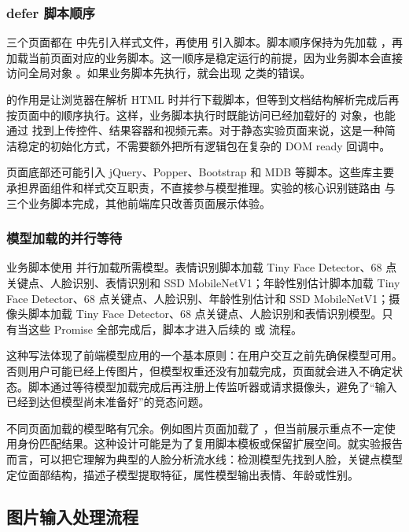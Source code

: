 \subsubsection{defer 脚本顺序}

三个页面都在  中先引入样式文件，再使用  引入脚本。脚本顺序保持为先加载 ，再加载当前页面对应的业务脚本。这一顺序是稳定运行的前提，因为业务脚本会直接访问全局对象 。如果业务脚本先执行，就会出现  之类的错误。

 的作用是让浏览器在解析 HTML 时并行下载脚本，但等到文档结构解析完成后再按页面中的顺序执行。这样，业务脚本执行时既能访问已经加载好的  对象，也能通过  找到上传控件、结果容器和视频元素。对于静态实验页面来说，这是一种简洁稳定的初始化方式，不需要额外把所有逻辑包在复杂的 DOM ready 回调中。

页面底部还可能引入 jQuery、Popper、Bootstrap 和 MDB 等脚本。这些库主要承担界面组件和样式交互职责，不直接参与模型推理。实验的核心识别链路由  与三个业务脚本完成，其他前端库只改善页面展示体验。

\subsubsection{模型加载的并行等待}

业务脚本使用  并行加载所需模型。表情识别脚本加载 Tiny Face Detector、68 点关键点、人脸识别、表情识别和 SSD MobileNetV1；年龄性别估计脚本加载 Tiny Face Detector、68 点关键点、人脸识别、年龄性别估计和 SSD MobileNetV1；摄像头脚本加载 Tiny Face Detector、68 点关键点、人脸识别和表情识别模型。只有当这些 Promise 全部完成后，脚本才进入后续的  或  流程。

这种写法体现了前端模型应用的一个基本原则：在用户交互之前先确保模型可用。否则用户可能已经上传图片，但模型权重还没有加载完成，页面就会进入不确定状态。脚本通过等待模型加载完成后再注册上传监听器或请求摄像头，避免了“输入已经到达但模型尚未准备好”的竞态问题。

不同页面加载的模型略有冗余。例如图片页面加载了 ，但当前展示重点不一定使用身份匹配结果。这种设计可能是为了复用脚本模板或保留扩展空间。就实验报告而言，可以把它理解为典型的人脸分析流水线：检测模型先找到人脸，关键点模型定位面部结构，描述子模型提取特征，属性模型输出表情、年龄或性别。

\subsection{图片输入处理流程}

